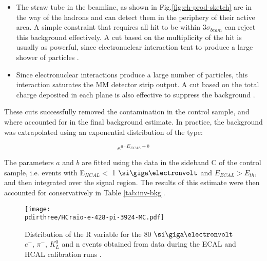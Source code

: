\begin{itemize}
\item The straw tube in the beamline, as shown in Fig.\ref{fig:eh-prod-sketch} are in the way of the hadrons and can detect them in the periphery of their active area. A simple constraint that requires all hit to be within 3$\sigma_{beam}$ can reject this background effectively. A cut based on the multiplicity of the hit is usually as powerful, since electronuclear interaction tent to produce a large shower of particles \cite{pdegen-thesis}.
\item Since electronuclear interactions produce a large number of particles, this interaction saturates the MM detector strip output. A cut based on the total charge deposited in each plane is also effective to suppress the background \cite{na64-invisible-cuts}.
\end{itemize}

These cuts successfully removed the contamination in the control sample, and where accounted for in the final background estimate. In practice, the background was extrapolated using an exponential distribution of the type:

\begin{equation}
  \label{eq:bkg-extrapolation}
  e^{a \cdot E_{ECAL} + b}
\end{equation}

The parameters $a$ and $b$ are fitted using the data in the sideband C of the control sample, i.e. events with E$_{HCAL}<$ 1 $\gev$ and $E_{ECAL}>E_{th}$, and then integrated over the signal region. The results of this estimate were then accounted for conservatively in Table \ref{tab:inv-bkg}.

\begin{figure}[bht!]
  \centering
  \texttt{[image: \\pdirthree/HCraio-e-428-pi-3924-MC.pdf]}
  \caption[R value comparison]{Distribution of the R variable for the 80 $\gev$ $e^-$, $\pi^-$, $K_L^0$ and n events obtained from data during the ECAL and HCAL calibration runs \cite{Banerjee:2020fue}.}
  \label{fig:R-comp}
\end{figure}

